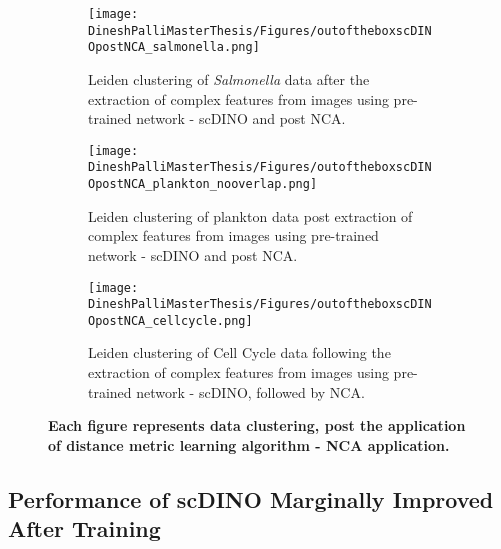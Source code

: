 \documentclass[12pt,a4paper]{article}
\begin{document}
\begin{figure}
  \centering
  \begin{subfigure}{\linewidth}
    \texttt{[image: DineshPalliMasterThesis/Figures/outoftheboxscDINOpostNCA\_salmonella.png]}
    \caption{Leiden clustering of \textit{Salmonella} data after the extraction of complex features from images using pre-trained network - scDINO and post NCA.}
    \label{multifig6:image_a}
  \end{subfigure}
  \hfill
  \begin{subfigure}{\linewidth}
    \texttt{[image: DineshPalliMasterThesis/Figures/outoftheboxscDINOpostNCA\_plankton\_nooverlap.png]}
    \caption{Leiden clustering of plankton data post extraction of complex features from images using pre-trained network - scDINO and post NCA.}
    \label{multifig6:image_b}
  \end{subfigure}
  \hfill
  \begin{subfigure}{\linewidth}
    \texttt{[image: DineshPalliMasterThesis/Figures/outoftheboxscDINOpostNCA\_cellcycle.png]}
    \caption{Leiden clustering of Cell Cycle data following the extraction of complex features from images using pre-trained network - scDINO, followed by NCA.}
    \label{multifig6:image_c}
  \end{subfigure}
  \caption[Clustering on features extracted from the images using deep learning model scDINO, post DML - NCA]{\textbf{Each figure represents data clustering, post the application of distance metric learning algorithm - NCA application.}}
  \label{multifig6:Outoftheboxclusters}
\end{figure}


\subsection{Performance of scDINO Marginally Improved After Training}
\end{document}
